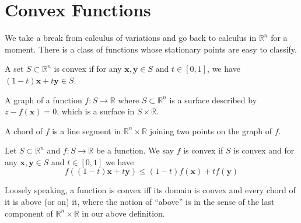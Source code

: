 \documentclass{article}
\begin{document}
\section{Convex Functions}
We take a break from calculus of variations and go back to calculus in $\mathbb R^n$ for a moment.
There is a class of functions whose stationary points are easy to classify.
\begin{definition}
    A set $S\subset\mathbb R^n$ is convex if for any $\mathbf{x},\mathbf{y}\in S$ and $t\in[0,1]$, we have $(1-t)\mathbf{x}+t\mathbf{y}\in S$.
\end{definition}
\begin{definition}
    A graph of a function $f:S\to\mathbb R$ where $S\subset\mathbb R^n$ is a surface described by $z-f(\mathbf{x})=0$, which is a surface in $S\times\mathbb R$.

    A chord of $f$ is a line segment in $\mathbb R^n\times\mathbb R$ joining two points on the graph of $f$.
\end{definition}
\begin{definition}
    Let $S\subset\mathbb R^n$ and $f:S\to\mathbb R$ be a function.
    We say $f$ is convex if $S$ is convex and for any $\mathbf{x},\mathbf{y}\in S$ and $t\in[0,1]$ we have
    $$f((1-t)\mathbf{x}+t\mathbf{y})\le (1-t)f(\mathbf{x})+tf(\mathbf{y})$$
\end{definition}
Loosely speaking, a function is convex iff its domain is convex and every chord of it is above (or on) it, where the notion of ``above'' is in the sense of the last component of $\mathbb R^n\times\mathbb R$ in our above definition.
\newpage
\end{document}
